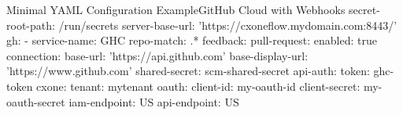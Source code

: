 \begin{code}{Minimal YAML Configuration Example}{GitHub Cloud with Webhooks}{}
secret-root-path: /run/secrets
server-base-url: 'https://cxoneflow.mydomain.com:8443/'
gh:
  - service-name: GHC
    repo-match: .*
    feedback:
      pull-request:
        enabled: true
    connection:
      base-url: 'https://api.github.com'
      base-display-url: 'https://www.github.com'
      shared-secret: scm-shared-secret
      api-auth:
        token: ghc-token
    cxone:
      tenant: mytenant
      oauth:
        client-id: my-oauth-id
        client-secret: my-oauth-secret
      iam-endpoint: US
      api-endpoint: US
\end{code}
  